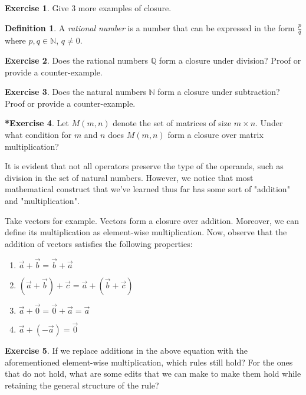 \documentclass[12pt]{article}
\theoremstyle{definition}
\newtheorem{defn}{Definition}[section]
\newtheorem{ex}{Exercise}[section]
\newtheorem{oex}[ex]{*Exercise}
\newcommand{\QQ}{\mathbb{Q}}
\newcommand{\NN}{\mathbb{N}}
\begin{document}
	\begin{ex}
		Give 3 more examples of closure.
	\end{ex}
	
	\begin{defn}
		A \emph{rational number} is a number that can be expressed in the form $\frac{p}{q}$ where $p, q \in \NN$, $q \neq 0$.
	\end{defn}
	
	\begin{ex}
		Does the rational numbers $\QQ$ form a closure under division? Proof or provide a counter-example.
	\end{ex}
	
	\begin{ex}
		Does the natural numbers $\NN$ form a closure under subtraction? Proof or provide a counter-example.
	\end{ex}
	
	\begin{oex}
		Let $M(m, n)$ denote the set of matrices of size $m \times n$. Under what condition for $m$ and $n$ does $M(m, n)$ form a closure over matrix multiplication?
	\end{oex}
	
	It is evident that not all operators preserve the type of the operands, such as division in the set of natural numbers. However, we notice that most mathematical construct that we've learned thus far has some sort of "addition" and "multiplication".
	
	Take vectors for example. Vectors form a closure over addition. Moreover, we can define its multiplication as element-wise multiplication. Now, observe that the addition of vectors satisfies the following properties:
	\begin{enumerate}
		\item $\vec{a} + \vec{b} = \vec{b} + \vec{a}$
		\item $(\vec{a} + \vec{b}) + \vec{c} = \vec{a} + (\vec{b} + \vec{c})$
		\item $\vec{a} + \vec{0} = \vec{0} + \vec{a} = \vec{a}$
		\item $\vec{a} + (-\vec{a}) = \vec{0}$
	\end{enumerate}
	
	\begin{ex}
		If we replace additions in the above equation with the aforementioned element-wise multiplication, which rules still hold? For the ones that do not hold, what are some edits that we can make to make them hold while retaining the general structure of the rule?
	\end{ex}
	
\end{document}
